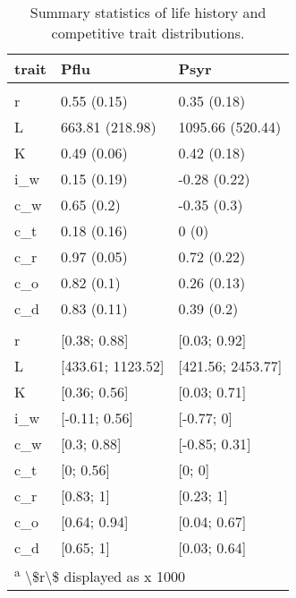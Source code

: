 \begin{table}

\caption{Summary statistics of life history and competitive trait distributions.}
\centering
\fontsize{8}{10}\selectfont
\begin{tabular}[t]{lll}
\toprule
trait & Pflu & Psyr\\
\midrule
\addlinespace[0.3em]
\multicolumn{3}{l}{\textbf{\textbackslash{}\$\textbackslash{}mu (\textbackslash{}sigma)\textbackslash{}\$}}\\
\hspace{1em}r & 0.55 (0.15) & 0.35 (0.18)\\
\hspace{1em}L & 663.81 (218.98) & 1095.66 (520.44)\\
\hspace{1em}K & 0.49 (0.06) & 0.42 (0.18)\\
\hspace{1em}i\_w & 0.15 (0.19) & -0.28 (0.22)\\
\hspace{1em}c\_w & 0.65 (0.2) & -0.35 (0.3)\\
\hspace{1em}c\_t & 0.18 (0.16) & 0 (0)\\
\hspace{1em}c\_r & 0.97 (0.05) & 0.72 (0.22)\\
\hspace{1em}c\_o & 0.82 (0.1) & 0.26 (0.13)\\
\hspace{1em}c\_d & 0.83 (0.11) & 0.39 (0.2)\\
\addlinespace[0.3em]
\multicolumn{3}{l}{\textbf{[min; max]}}\\
\hspace{1em}r & [0.38; 0.88] & [0.03; 0.92]\\
\hspace{1em}L & [433.61; 1123.52] & [421.56; 2453.77]\\
\hspace{1em}K & [0.36; 0.56] & [0.03; 0.71]\\
\hspace{1em}i\_w & [-0.11; 0.56] & [-0.77; 0]\\
\hspace{1em}c\_w & [0.3; 0.88] & [-0.85; 0.31]\\
\hspace{1em}c\_t & [0; 0.56] & [0; 0]\\
\hspace{1em}c\_r & [0.83; 1] & [0.23; 1]\\
\hspace{1em}c\_o & [0.64; 0.94] & [0.04; 0.67]\\
\hspace{1em}c\_d & [0.65; 1] & [0.03; 0.64]\\
\bottomrule
\multicolumn{3}{l}{\textsuperscript{a} \textbackslash{}\$r\textbackslash{}\$ displayed as x 1000}\\
\end{tabular}
\end{table}